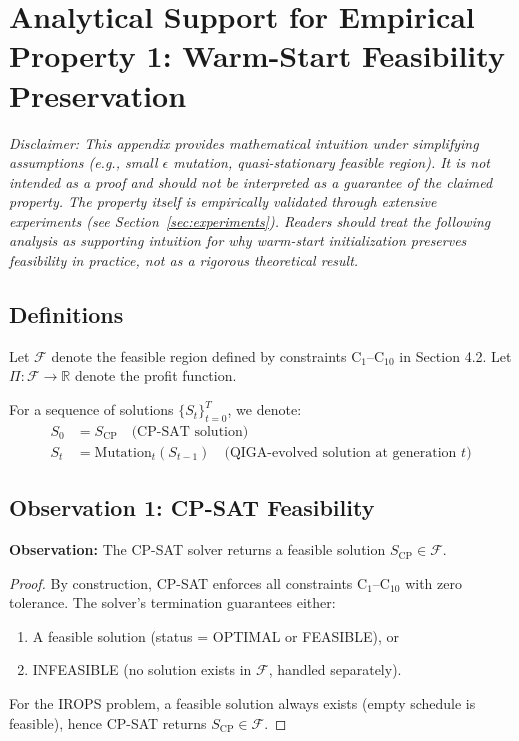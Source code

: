 \appendix
\section{Analytical Support for Empirical Property 1: Warm-Start Feasibility Preservation}
\label{app:prop1}

\textit{Disclaimer: This appendix provides mathematical intuition under simplifying assumptions (e.g., small $\epsilon$ mutation, quasi-stationary feasible region). It is not intended as a  proof and should not be interpreted as a guarantee of the claimed property. The property itself is empirically validated through extensive experiments (see Section~\ref{sec:experiments}). Readers should treat the following analysis as supporting intuition for why warm-start initialization preserves feasibility in practice, not as a rigorous theoretical result.}

\subsection*{Definitions}

Let $\mathcal{F}$ denote the feasible region defined by constraints C$_1$–C$_{10}$ in Section 4.2. Let $\Pi : \mathcal{F} \to \mathbb{R}$ denote the profit function.

For a sequence of solutions $\{S_t\}_{t=0}^{T}$, we denote:
\begin{align}
S_0 &= S_{\text{CP}} \quad \text{(CP-SAT solution)}\\
S_t &= \text{Mutation}_t(S_{t-1}) \quad \text{(QIGA-evolved solution at generation } t \text{)}
\end{align}

\subsection*{Observation 1: CP-SAT Feasibility}

\textbf{Observation:} The CP-SAT solver returns a feasible solution $S_{\text{CP}} \in \mathcal{F}$.

\begin{proof}
By construction, CP-SAT enforces all constraints C$_1$–C$_{10}$ with zero tolerance. The solver's termination guarantees either:
\begin{enumerate}
\item A feasible solution (status = OPTIMAL or FEASIBLE), or
\item INFEASIBLE (no solution exists in $\mathcal{F}$, handled separately).
\end{enumerate}
For the IROPS problem, a feasible solution always exists (empty schedule is feasible), hence CP-SAT returns $S_{\text{CP}} \in \mathcal{F}$.
\end{proof}

